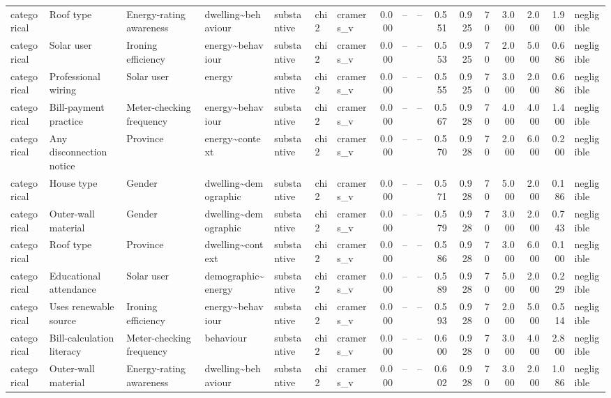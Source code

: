 \begin{table}
\begin{tabular}{lllllllrrrrrrrrrl}
categorical & Roof type & Energy-rating awareness & dwelling\textasciitilde behaviour & substantive & chi2 & cramers\_v & 0.000 & -- & -- & 0.551 & 0.925 & 70 & 3.000 & 2.000 & 1.900 & negligible \\
categorical & Solar user & Ironing efficiency & energy\textasciitilde behaviour & substantive & chi2 & cramers\_v & 0.000 & -- & -- & 0.553 & 0.925 & 70 & 2.000 & 5.000 & 0.686 & negligible \\
categorical & Professional wiring & Solar user & energy & substantive & chi2 & cramers\_v & 0.000 & -- & -- & 0.555 & 0.925 & 70 & 3.000 & 2.000 & 0.686 & negligible \\
categorical & Bill-payment practice & Meter-checking frequency & energy\textasciitilde behaviour & substantive & chi2 & cramers\_v & 0.000 & -- & -- & 0.567 & 0.928 & 70 & 4.000 & 4.000 & 1.400 & negligible \\
categorical & Any disconnection notice & Province & energy\textasciitilde context & substantive & chi2 & cramers\_v & 0.000 & -- & -- & 0.570 & 0.928 & 70 & 2.000 & 6.000 & 0.200 & negligible \\
categorical & House type & Gender & dwelling\textasciitilde demographic & substantive & chi2 & cramers\_v & 0.000 & -- & -- & 0.571 & 0.928 & 70 & 5.000 & 2.000 & 0.186 & negligible \\
categorical & Outer-wall material & Gender & dwelling\textasciitilde demographic & substantive & chi2 & cramers\_v & 0.000 & -- & -- & 0.579 & 0.928 & 70 & 3.000 & 2.000 & 0.743 & negligible \\
categorical & Roof type & Province & dwelling\textasciitilde context & substantive & chi2 & cramers\_v & 0.000 & -- & -- & 0.586 & 0.928 & 70 & 3.000 & 6.000 & 0.100 & negligible \\
categorical & Educational attendance & Solar user & demographic\textasciitilde energy & substantive & chi2 & cramers\_v & 0.000 & -- & -- & 0.589 & 0.928 & 70 & 5.000 & 2.000 & 0.229 & negligible \\
categorical & Uses renewable source & Ironing efficiency & energy\textasciitilde behaviour & substantive & chi2 & cramers\_v & 0.000 & -- & -- & 0.593 & 0.928 & 70 & 2.000 & 5.000 & 0.514 & negligible \\
categorical & Bill-calculation literacy & Meter-checking frequency & behaviour & substantive & chi2 & cramers\_v & 0.000 & -- & -- & 0.600 & 0.928 & 70 & 3.000 & 4.000 & 2.800 & negligible \\
categorical & Outer-wall material & Energy-rating awareness & dwelling\textasciitilde behaviour & substantive & chi2 & cramers\_v & 0.000 & -- & -- & 0.602 & 0.928 & 70 & 3.000 & 2.000 & 1.086 & negligible \\

\end{tabular}
\end{table}
